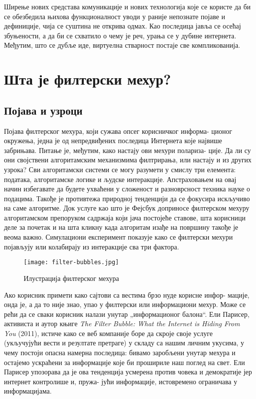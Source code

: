 \documentclass[a4paper]{article}
\begin{document}
Ширење нових средстава комуникације и нових технологија које се користе да би се обезбедила њихова функционалност уводи у раније непознате појаве и дефиниције, чија се суштина не открива одмах. Као последица јавља се осећај збуњености, а да би се схватило о чему је реч, урања се у дубине интернета. Међутим, што се дубље иде, виртуелна стварност постаје све компликованија.


\newpage
\section{Шта је филтерски мехур?}
\label{sec:naslov2}

\subsection{Појава и узроци}
\label{subsec:podnaslov3}

Појава филтерског мехура, који сужава опсег корисничког информа-
ционог окружења, једна је од непредвиђених последица Интернета које највише забрињава. Питање је, међутим, како настају ови мехури полариза-
ције. Да ли су они својствени алгоритамским механизмима филтрирања, или настају и из других узрока? Сви алгоритамски системи се могу разумети у смислу три елемента: података, алгоритамске логике и људске интеракције. Апстраховањем на овај начин избегавате да будете ухваћени у сложеност и разноврсност техника науке о подацима. Такође је противтежа природној тенденцији да се фокусира искључиво на саме алгоритме. Док услуге као што је Фејсбук доприносе филтерском мехуру алгоритамском препоруком садржаја који јача постојеће ставове, шта корисници деле за почетак и на шта кликну када алгоритам изађе на површину такође је веома важно. Симулациони експеримент показује како се филтерски мехури појављују или колабирају из интеракције сва три фактора.

\begin{figure}[hbt!]
\centering
\texttt{[image: filter-bubbles.jpg]}
\caption{Илустрација филтерског мехура}
\end{figure}

Ако корисник примети како сајтови са вестима брзо нуде корисне инфор-
мације, онда је, а да то није знао, упао у филтерски или информациони мехур. Може се рећи да се сваки корисник налази унутар „информационог балона“. Ели Парисер, активиста и аутор књиге \emph{The Filter Bubble: What the Internet is Hiding From You} (2011), истиче како се веб компаније боре да скроје своје услуге (укључујући вести и резултате претраге) у складу са нашим личним укусима, у чему постоји опасна намерна последица: бивамо заробљени унутар мехура и остајемо ускраћени за информације које би прошириле наш поглед на свет. Ели Парисер упозорава да је ова тенденција усмерена против човека и демократије јер интернет контролише и, пружа-
јући информације, истовремено ограничава у информацијама.\cite{pariser}
\end{document}
